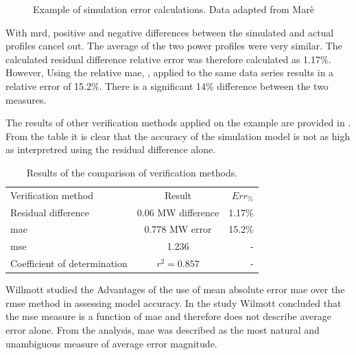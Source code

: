  		
 	\begin{figure}[h!]
 		\centering
 		
 		\caption[Example of simulation error calculations]{Example of simulation error calculations. Data adapted from Marè \cite{Mare2016PhD}}
 		\label{fig:Philipp Difference verify}
 	\end{figure}
 With \gls{mrd}, positive and negative differences between the simulated and actual profiles cancel out. The average of the two power profiles were very similar. The calculated residual difference relative error was therefore calculated as 1.17\%. However, Using the relative \gls{mae}, , applied to the same data series results in a relative error of 15.2\%. There is a significant 14\% difference between the two measures. 
 \par
 The results of other verification methods applied on the example are provided in . From the table it is clear that the accuracy of the simulation model is not as high as interpretred using the residual difference alone.
 \begin{table}[h!]
 	\centering
 	\begin{tabular}{lcr}
 		\hline
 		Verification method & Result & $Err_{\%}$\\
 		\hhline{===}
 		Residual difference     & 0.06 MW difference & 1.17\% \\
 		\gls{mae} 					 & 0.778 MW error & 15.2\% \\
 		\gls{mse} 				   & 1.236  & -\\
 		Coefficient of determination & $r^2 =0.857$  & -\\
 		\hline
 	\end{tabular} 
 \caption{Results of the comparison of verification methods.}
 \label{Philip verification table}
 \end{table}
 
 	\par 
 	Willmott \cite{willmott2005advantages} studied the Advantages of the use of mean absolute error \gls{mae} over the \gls{rmse} method in assessing model accuracy. In the study Wilmott concluded that the \gls{mse} measure is a function of \gls{mae} and therefore does not describe average error alone. From the analysis, \gls{mae} was described as the most natural and unambiguous measure of average error magnitude.

